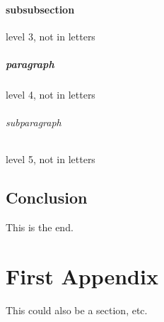 \documentclass[12pt,letterpaper,draft]{article}
\begin{document}
  \subsubsection{subsubsection}
  level 3, not in letters
  \paragraph{paragraph}
  level 4, not in letters
  \subparagraph{subparagraph}
  level 5, not in letters
  
  \section{Conclusion}

  This is the end.

  \appendix
  \chapter{First Appendix}

  This could also be a section, etc.

  


\end{document}
